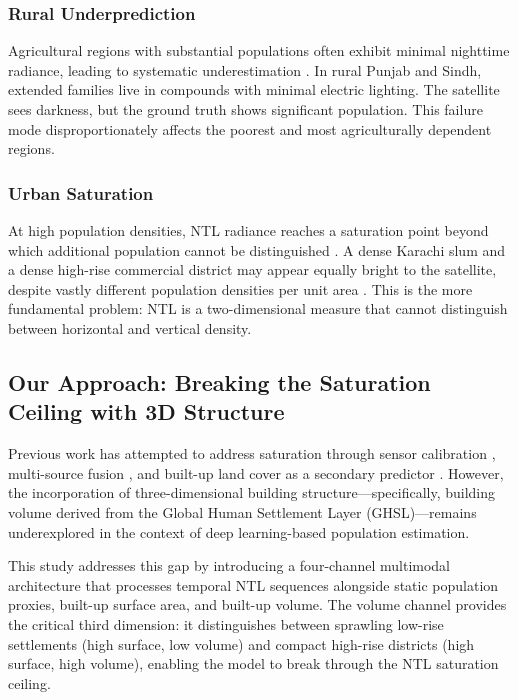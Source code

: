 \documentclass[12pt,a4paper]{article}
\begin{document}
\subsubsection{Rural Underprediction}

Agricultural regions with substantial populations often exhibit minimal nighttime radiance, leading to systematic underestimation \citep{storeygard2016farther}. In rural Punjab and Sindh, extended families live in compounds with minimal electric lighting. The satellite sees darkness, but the ground truth shows significant population. This failure mode disproportionately affects the poorest and most agriculturally dependent regions.

\subsubsection{Urban Saturation}

At high population densities, NTL radiance reaches a saturation point beyond which additional population cannot be distinguished \citep{wu2023bvani}. A dense Karachi slum and a dense high-rise commercial district may appear equally bright to the satellite, despite vastly different population densities per unit area \citep{pesaresi2023ghsl}. This is the more fundamental problem: NTL is a two-dimensional measure that cannot distinguish between horizontal and vertical density.

\subsection{Our Approach: Breaking the Saturation Ceiling with 3D Structure}
\label{subsec:approach}

Previous work has attempted to address saturation through sensor calibration \citep{li2014syria}, multi-source fusion \citep{foody1998sharpening}, and built-up land cover as a secondary predictor \citep{linard2013improving}. However, the incorporation of three-dimensional building structure---specifically, building volume derived from the Global Human Settlement Layer (GHSL)---remains underexplored in the context of deep learning-based population estimation.

This study addresses this gap by introducing a four-channel multimodal architecture that processes temporal NTL sequences alongside static population proxies, built-up surface area, and built-up volume. The volume channel provides the critical third dimension: it distinguishes between sprawling low-rise settlements (high surface, low volume) and compact high-rise districts (high surface, high volume), enabling the model to break through the NTL saturation ceiling.
\end{document}
